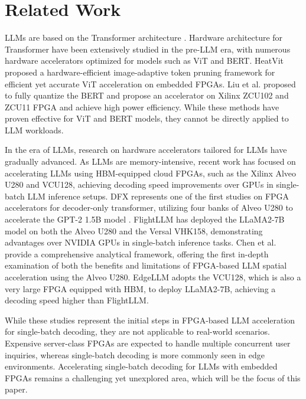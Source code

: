 \section{Related Work}
LLMs are based on the Transformer architecture \cite{vaswani2017attention}. 
Hardware architecture for Transformer have been extensively studied in the pre-LLM era, with numerous hardware accelerators optimized for models such as ViT\cite{dosovitskiy2020image} and BERT\cite{devlin2018bert}.
HeatVit\cite{dong2023heatvit} proposed a hardware-efficient image-adaptive token pruning framework for efficient yet accurate ViT acceleration on embedded FPGAs. Liu et al. \cite{liu2021hardware} proposed to fully quantize the BERT and propose an accelerator on Xilinx ZCU102 and ZCU11 FPGA and achieve high power efficiency.
While these methods have proven effective for ViT and BERT models, they cannot be directly applied to LLM workloads.

In the era of LLMs, research on hardware accelerators tailored for LLMs have gradually advanced.
As LLMs are memory-intensive, recent work has focused on accelerating LLMs using HBM-equipped cloud FPGAs, such as the Xilinx Alveo U280 and VCU128, achieving decoding speed improvements over GPUs in single-batch LLM inference setups.
DFX \cite{hong2022dfx} represents one of the first studies on FPGA accelerators for decoder-only transformer, utilizing four banks of Alveo U280 to accelerate the GPT-2 1.5B model \cite{radford2019language}. FlightLLM \cite{zeng2024flightllm} has deployed the LLaMA2-7B model \cite{touvron2023llama} on both the Alveo U280 and the Versal VHK158, demonstrating advantages over NVIDIA GPUs in single-batch inference tasks. Chen et al. \cite{chen2023understanding} provide a comprehensive analytical framework, offering the first in-depth examination of both the benefits and limitations of FPGA-based LLM spatial acceleration using the Alveo U280. EdgeLLM \cite{huang2024edgellm} adopts the VCU128, which is also a very large FPGA equipped with HBM, to deploy LLaMA2-7B, achieving a decoding speed higher than FlightLLM.

While these studies represent the initial steps in FPGA-based LLM acceleration for single-batch decoding, they are not applicable to real-world scenarios. Expensive server-class FPGAs are expected to handle multiple concurrent user inquiries, whereas single-batch decoding is more commonly seen in edge environments.
Accelerating single-batch decoding for LLMs with embedded FPGAs remains a challenging yet unexplored area, which will be the focus of this paper.